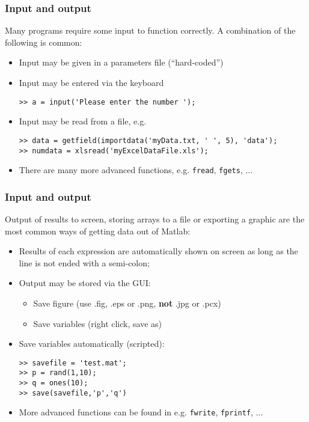 \documentclass[11pt,table,final,fleqn,xcolor={usenames,dvipsnames}]{beamer}
\begin{document}

\begin{frame}[fragile]
 \frametitle{Input and output}
 Many programs require some input to function correctly. A combination of the following is common:
 \begin{itemize}
   \item Input may be given in a parameters file (``hard-coded'')
   \item Input may be entered via the keyboard
   \begin{lstlisting}
>> a = input('Please enter the number ');
   \end{lstlisting}
   \item Input may be read from a file, e.g.
    \begin{lstlisting}
>> data = getfield(importdata('myData.txt, ' ', 5), 'data');
>> numdata = xlsread('myExcelDataFile.xls');
   \end{lstlisting}
   \item There are many more advanced functions, e.g. \lstinline$fread$, \lstinline$fgets$, ...
 \end{itemize}
\end{frame}

\begin{frame}[fragile]
 \frametitle{Input and output}
 Output of results to screen, storing arrays to a file or exporting a graphic are the most common ways of getting data out of Matlab:
 \begin{itemize}
   \item Results of each expression are automatically shown on screen as long as the line is not ended with a semi-colon;
   \item Output may be stored via the GUI:
    \begin{itemize}
      \item Save figure (use .fig, .eps or .png, \textbf{not} .jpg or .pcx)
      \item Save variables (right click, save as)
    \end{itemize}
   \item Save variables automatically (scripted):
    \begin{lstlisting}
>> savefile = 'test.mat';
>> p = rand(1,10);
>> q = ones(10);
>> save(savefile,'p','q')
   \end{lstlisting}
   \item More advanced functions can be found in e.g.  \lstinline$fwrite$, \lstinline$fprintf$, ...
 \end{itemize}
\end{frame}
\end{document}
